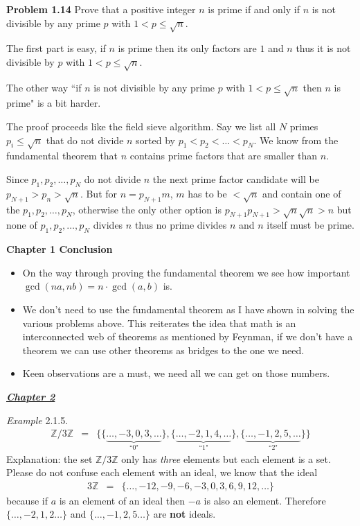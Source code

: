 \documentclass[aps,preprint,preprintnumbers,nofootinbib,showpacs,prd]{revtex4-1}
\newcommand{\bit}{\begin{itemize}}
\newcommand{\eit}{\end{itemize}}
\newcommand{\nbea}{\begin{eqnarray*}}
\newcommand{\neea}{\end{eqnarray*}}
\begin{document}
{\bf Problem 1.14} Prove that a positive integer $n$ is prime if and only if $n$ is not divisible by any prime $p$ with $1 < p \le \sqrt{n}$.

The first part is easy, if $n$ is prime then its only factors are $1$ and $n$ thus it is not divisible by $p$ with $1 < p \le \sqrt{n}$.

The other way ``if $n$ is not divisible by any prime $p$ with $1 < p \le \sqrt{n}$ then $n$ is prime" is a bit harder.

The proof proceeds like the field sieve algorithm. Say we list all $N$ primes $p_i \le \sqrt{n}$ that do not divide $n$ sorted by $p_1 < p_2 < \dots < p_N$. We know from the fundamental theorem that $n$ contains prime factors that are smaller than $n$.

Since $p_1, p_2, \dots, p_N$ do not divide $n$ the next prime factor candidate will be $p_{N+1} > p_n > \sqrt{n}$. But for $n = p_{N+1} m$, $m$ has to be $< \sqrt{n}$ and contain one of the $p_1, p_2, \dots, p_N$, otherwise the only other option is $p_{N+1}p_{N+1} > \sqrt{n}\sqrt{n} > n$ but none of $p_1, p_2, \dots, p_N$ divides $n$ thus no prime divides $n$ and $n$ itself must be prime.

{\bf Chapter 1 Conclusion}
%
\bit
\item On the way through proving the fundamental theorem we see how important $\gcd(na,nb) = n \cdot \gcd(a,b)$ is.
\item We don't need to use the fundamental theorem as I have shown in solving the various problems above. This reiterates the idea that math is an interconnected web of theorems as mentioned by Feynman, if we don't have a theorem we can use other theorems as bridges to the one we need.
\item Keen observations are a must, we need all we can get on those numbers.
\eit
%

\bigskip
\underline{\textbf{\textit{Chapter 2}}}
\bigskip

{\it Example }2.1.5.
%
\nbea
\mathbb{Z}/3\mathbb{Z} & = & \{ \{\underbrace{\dots, -3,0,3, \dots}_\text{``0"}\}, \{\underbrace{\dots, -2,1,4, \dots}_\text{``1"}\}, \{\underbrace{\dots, -1,2,5, \dots}_\text{``2"}\} \}
\neea
%
Explanation: the set $\mathbb{Z}/3\mathbb{Z}$ only has {\it three} elements but each element is a set. Please do not confuse each element with an ideal, we know that the ideal
%
\nbea
3\mathbb{Z} & = & \{\dots, -12,-9,-6,-3,0,3,6,9,12, \dots\}
\neea
%
because if $a$ is an element of an ideal then $-a$ is also an element. Therefore $\{\dots, -2,1,2 \dots\}$ and $\{\dots, -1,2,5 \dots\}$ are {\bf not} ideals.
\end{document}
